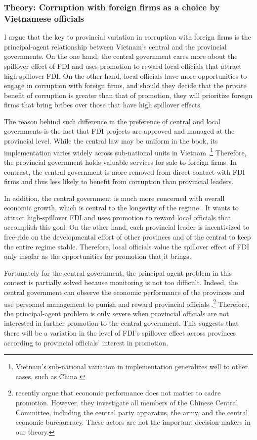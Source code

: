 \subsubsection{Theory: Corruption with foreign firms as a choice by Vietnamese officials} 

I argue that the key to provincial variation in corruption with foreign firms is the principal-agent relationship between Vietnam's central and the provincial governments. On the one hand, the central government cares more about the spillover effect of FDI and uses promotion to reward local officials that attract high-spillover FDI. On the other hand, local officials have more opportunities to engage in corruption with foreign firms, and should they decide that the private benefit of corruption is greater than that of promotion, they will prioritize foreign firms that bring bribes over those that have high spillover effects.

The reason behind such difference in the preference of central and local governments is the fact that FDI projects are approved and managed at the provincial level. While the central law may be uniform in the book, its implementation varies widely across sub-national units in Vietnam \citep{Meyer2005}.\footnote{Vietnam's sub-national variation in implementation generalizes well to other cases, such as China \citep{Thun2006}} Therefore, the provincial government holds valuable services for sale to foreign firms. In contrast, the central government is more removed from direct contact with FDI firms and thus less likely to benefit from corruption than provincial leaders. 

In addition, the central government is much more concerned with overall economic growth, which is central to the longevity of the regime \citep{Malesky2008}. It wants to attract high-spillover FDI and uses promotion to reward local officials that accomplish this goal. On the other hand, each provincial leader is incentivized to free-ride on the developmental effort of other provinces and of the central to keep the entire regime stable. Therefore, local officials value the spillover effect of FDI only insofar as the opportunities for promotion that it brings.

Fortunately for the central government, the principal-agent problem in this context is partially solved because monitoring is not too difficult. Indeed, the central government can observe the economic performance of the provinces and use personnel management to punish and reward provincial officials \citep{Sheng2007, Li2005}.\footnote{\citet{Shih2012} recently argue that economic performance does not matter to cadre promotion. However, they investigate all members of the Chinese Central Committee, including the central party apparatus, the army, and the central economic bureaucracy. These actors are not the important decision-makers in our theory.} Therefore, the principal-agent problem is only severe when provincial officials are not interested in further promotion to the central government. This suggests that there will be a variation in the level of FDI's spillover effect across provinces according to provincial officials' interest in promotion. 


